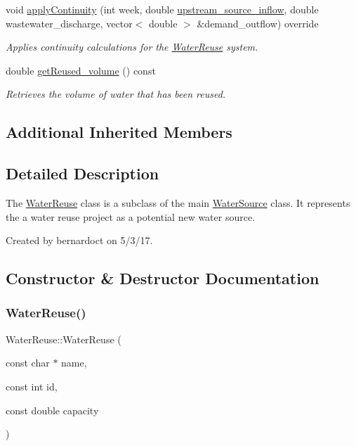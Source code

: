 \begin{DoxyCompactItemize}
void \mbox{\hyperlink{classWaterReuse_ab8ffb10c69790047a3a5dda66cfaf3ee}{apply\+Continuity}} (int week, double \mbox{\hyperlink{classWaterSource_a7a69b2e9b6030f1035e6cf44d2918ee5}{upstream\+\_\+source\+\_\+inflow}}, double wastewater\+\_\+discharge, vector$<$ double $>$ \&demand\+\_\+outflow) override
\begin{DoxyCompactList}\small\item\em Applies continuity calculations for the \mbox{\hyperlink{classWaterReuse}{Water\+Reuse}} system. \end{DoxyCompactList}\item 
double \mbox{\hyperlink{classWaterReuse_a78c905f77ca46fbbb2251f9cfa9a04de}{get\+Reused\+\_\+volume}} () const
\begin{DoxyCompactList}\small\item\em Retrieves the volume of water that has been reused. \end{DoxyCompactList}\end{DoxyCompactItemize}
\subsection*{Additional Inherited Members}


\subsection{Detailed Description}
The {\ttfamily \mbox{\hyperlink{classWaterReuse}{Water\+Reuse}}} class is a subclass of the main {\ttfamily \mbox{\hyperlink{classWaterSource}{Water\+Source}}} class. It represents the a water reuse project as a potential new water source. 

Created by bernardoct on 5/3/17. 

\subsection{Constructor \& Destructor Documentation}
\mbox{\label{classWaterReuse_a0493da65856f50fad2bc2d2c087f378f}} 
\subsubsection{\texorpdfstring{Water\+Reuse()}{WaterReuse()}\hspace{0.1cm}{\footnotesize\ttfamily [1/3]}}
{\footnotesize\ttfamily Water\+Reuse\+::\+Water\+Reuse (\begin{DoxyParamCaption}\item[{const char $\ast$}]{name,  }\item[{const int}]{id,  }\item[{const double}]{capacity }\end{DoxyParamCaption})}



